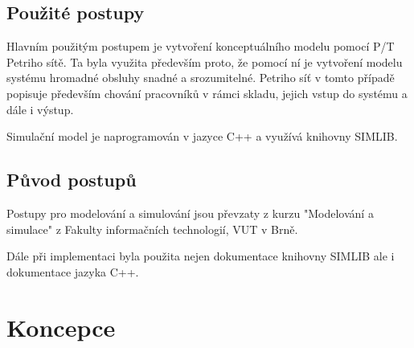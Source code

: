 \documentclass[11pt]{article}
\begin{document}
	\subsection{Použité postupy}
	Hlavním použitým postupem je vytvoření konceptuálního modelu\cite[str.~48]{ims-prezentace} pomocí P/T Petriho sítě\cite[str.~123]{ims-prezentace}.
	Ta byla využita především proto, že pomocí ní je vytvoření modelu systému hromadné obsluhy\cite[str.~136]{ims-prezentace} snadné a srozumitelné.
	Petriho síť v tomto případě popisuje především chování pracovníků v rámci skladu, jejich vstup do systému a dále i výstup.
	
	Simulační model je naprogramován v jazyce C++ a využívá knihovny SIMLIB\cite{simlib}.
	
	\subsection{Původ postupů}
	Postupy pro modelování a simulování jsou převzaty z kurzu "Modelování a simulace"\cite{fit-ims} z Fakulty informačních technologií, VUT v Brně\cite{fit}.
	
	Dále při implementaci byla použita nejen dokumentace knihovny SIMLIB\cite{simlib-dokumentace} ale i dokumentace jazyka C++\cite{c++doc}.
	
	
	\section{Koncepce}
	
	
	
\end{document}
